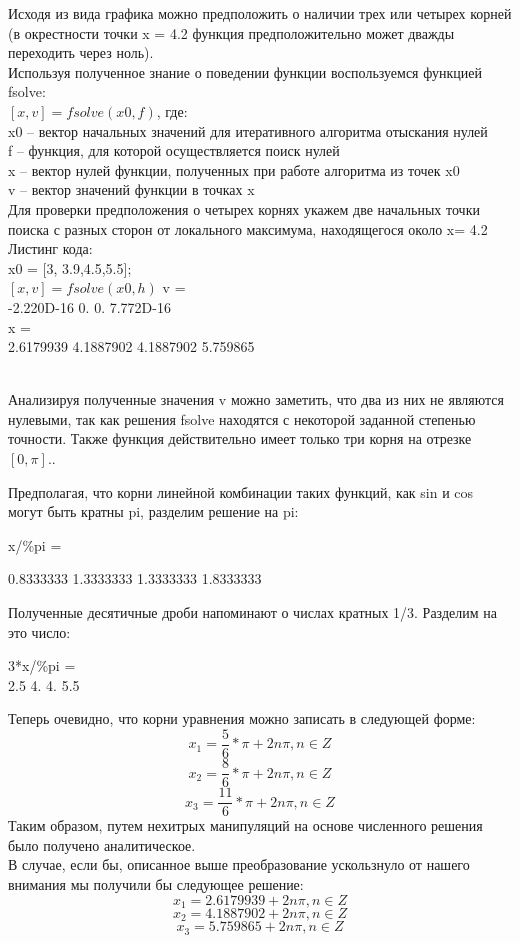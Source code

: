 \documentclass[russian,utf8,nocolumnxxxi,nocolumnxxxii]{eskdtext}
\begin{document}
Исходя из вида графика можно предположить о наличии трех или четырех корней (в окрестности точки x = 4.2 функция предположительно может дважды переходить через ноль).
\\Используя полученное знание о поведении функции воспользуемся функцией fsolve:
\\$[x,v] = fsolve(x0,f)$, где:
\\x0 – вектор начальных значений для итеративного алгоритма отыскания нулей
\\f – функция, для которой осуществляется поиск нулей
\\x – вектор нулей функции, полученных при работе алгоритма из точек x0
\\v – вектор значений функции в точках x
\\Для проверки предположения о четырех корнях укажем две начальных точки поиска с разных сторон от локального максимума, находящегося около x= 4.2
\\Листинг кода:
\\x0 = [3, 3.9,4.5,5.5];
\\$[x,v] = fsolve(x0,h)$
\newpage
v =\\
-2.220D-16 0. 0. 7.772D-16\\
x =\\
2.6179939 4.1887902 4.1887902 5.759865


\\Анализируя полученные значения v можно заметить, что два из них не являются нулевыми, так как решения fsolve находятся с некоторой заданной степенью точности. Также функция действительно имеет только три корня на отрезке $[0,\pi]$..

Предполагая, что корни линейной комбинации таких функций, как sin и cos могут быть кратны pi, разделим решение на pi:

x/\%pi =

0.8333333 1.3333333 1.3333333 1.8333333

Полученные десятичные дроби напоминают о числах кратных 1/3. Разделим на это число:

3*x/\%pi =
\\2.5 4. 4. 5.5

\newpage
Теперь очевидно, что корни уравнения можно записать в следующей форме:
$$x_1=\frac{5}{6}*\pi+2n\pi,n\in Z$$
$$x_2=\frac{8}{6}*\pi+2n\pi,n\in Z$$
$$x_3=\frac{11}{6}*\pi+2n\pi,n\in Z$$
Таким образом, путем нехитрых манипуляций на основе численного решения было получено аналитическое.\\
В случае, если бы, описанное выше преобразование ускользнуло от нашего внимания мы получили бы следующее решение:
$$x_1=2.6179939+2n\pi,n\in Z$$
$$x_2=4.1887902+2n\pi,n\in Z$$
$$x_3=5.759865+2n\pi,n\in Z$$
\end{document}
